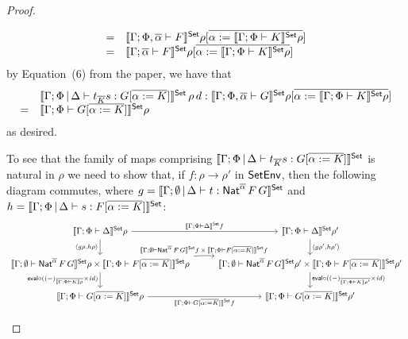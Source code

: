 \documentclass[acmsmall,review,anonymous]{acmart}
\theoremstyle{definition}
\renewcommand{\id}{\mathit{id}}
\begin{document}
\begin{proof}
\begin{itemize}
\[\begin{array}{ll}
  =&\llbracket{\Gamma; \Phi, \overline{\alpha} \vdash F}\rrbracket^{\mathsf{Set}}\rho[\overline{\alpha :=
    \llbracket{\Gamma;\Phi \vdash K}\rrbracket^{\mathsf{Set}}\rho}] \\
    =& \llbracket{\Gamma;
  \overline{\alpha} \vdash F}\rrbracket^{\mathsf{Set}}\rho[\overline{\alpha := \llbracket{\Gamma;\Phi \vdash
      K}\rrbracket^{\mathsf{Set}}\rho}] 
\end{array}\]
by Equation~(6) from the paper, we have that 
\[\begin{array}{ll}
  &\llbracket{\Gamma;\Phi \,|\, \Delta
  \vdash t_{\overline K} s: G [\overline{\alpha :=
      K}]}\rrbracket^{\mathsf{Set}}\,\rho\,d : \llbracket{\Gamma; \Phi ,\overline{\alpha} \vdash
  G}\rrbracket^{\mathsf{Set}}\rho[\overline{\alpha := \llbracket{\Gamma;\Phi \vdash K}\rrbracket^{\mathsf{Set}}\rho}]  \\
  =&\llbracket{\Gamma; \Phi \vdash G[\overline{\alpha := K}]}\rrbracket^{\mathsf{Set}}\rho
\end{array}\]
as desired.

\vspace*{0.1in}

To see that the family of maps comprising $\llbracket{\Gamma;\Phi \,|\,
  \Delta \vdash t_{\overline K} s: G [\overline{\alpha := K}]}\rrbracket^{\mathsf{Set}}$
is natural in $\rho$
we need to show that, if $f : \rho \to \rho'$ in $\mathsf{SetEnv}$, then the
following diagram commutes, where $g = \llbracket{\Gamma; \emptyset \,|\,
  \Delta \vdash t : \mathsf{Nat}^{\overline{\alpha}} \,F \,G}\rrbracket^{\mathsf{Set}}$ and $h =
\llbracket{\Gamma;\Phi \,|\, \Delta \vdash s: F [\overline{\alpha :=
      K}]}\rrbracket^{\mathsf{Set}}$:
{\footnotesize
\[\begin{tikzcd}
\oCPOsem{\Gamma;\Phi \vdash \Delta}\rho \ar[r, "{\oCPOsem{\Gamma;\Phi
  \vdash \Delta}f}"] \ar[d, "{\langle g \rho, h \rho\rangle}"']
& \oCPOsem{\Gamma;\Phi \vdash 
  \Delta}\rho' \ar[d, "{\langle g \rho', h \rho' \rangle}"]\\
\oCPOsem{\Gamma;\emptyset \vdash \Nat^{\overline{\alpha}} \,F \,G}\rho
\times \oCPOsem{\Gamma;\Phi \vdash F [\overline{\alpha := K}]}\rho
\ar[d, "{\eval \circ ((-)_{\overline{\sem{\Gamma;\Phi \vdash K}\rho}} \times
    \id)}"']
\ar[r, bend left = 5, "{\oCPOsem{\Gamma;\emptyset\vdash
      \Nat^{\overline{\alpha}} \,F \,G}f\, \times\, \oCPOsem{\Gamma;\Phi
      \vdash F [\overline{\alpha := K}]}f}"] &
\oCPOsem{\Gamma;\emptyset \vdash \Nat^{\overline{\alpha}} \,F \,G}\rho'
\times \oCPOsem{\Gamma;\Phi \vdash F [\overline{\alpha := K}]}\rho'
\ar[d, "{\eval \circ ((-)_{\overline{\sem{\Gamma;\Phi \vdash
          K}\rho'}} \times \id)}"] \\
\oCPOsem{\Gamma;\Phi \vdash G [\overline{\alpha := K}]}\rho
\ar[r, "{\oCPOsem{\Gamma;\Phi \vdash G [\overline{\alpha := K}]}f}"']
&
\oCPOsem{\Gamma;\Phi \vdash G [\overline{\alpha := K}]}\rho'
\end{tikzcd}\]}


\end{itemize}
\end{proof}
\end{document}
